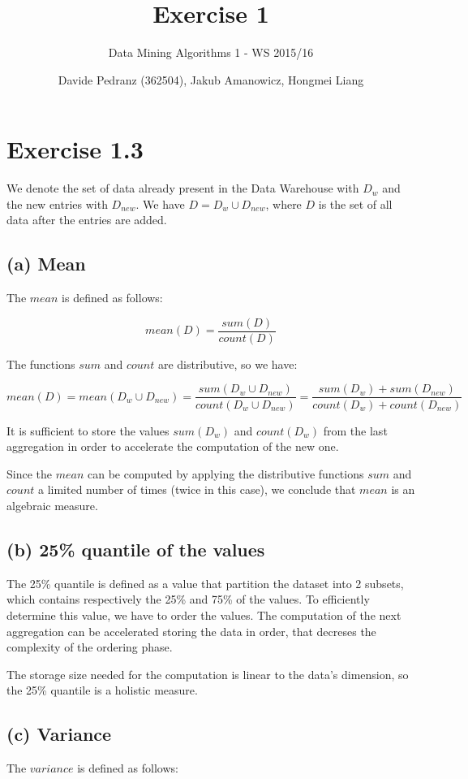 \documentclass{scrartcl}
\title{Exercise 1}
\subtitle{Data Mining Algorithms 1 - WS 2015/16}
\author{Davide Pedranz (362504), Jakub Amanowicz, Hongmei Liang}
\begin{document}
\maketitle

\section*{Exercise 1.3}
We denote the set of data already present in the Data Warehouse with $D_{w}$ and the new entries with $D_{new}$. We have $D = D_{w} \cup D_{new}$, where $D$ is the set of all data after the entries are added.

\subsection*{(a) Mean}
The $mean$ is defined as follows:

$$ mean(D) = \frac{sum(D)}{count(D)} $$

\bigskip
The functions $sum$ and $count$ are distributive, so we have:

$$ mean(D) = mean(D_{w} \cup D_{new}) = \frac{sum(D_{w} \cup D_{new})}{count(D_{w} \cup D_{new})} = \frac{sum(D_{w}) + sum(D_{new})}{count(D_{w}) + count(D_{new})} $$

\bigskip
It is sufficient to store the values $sum(D_{w})$ and $count(D_{w})$ from the last aggregation in order to accelerate the computation of the new one.

Since the $mean$ can be computed by applying the distributive functions $sum$ and $count$ a limited number of times (twice in this case), we conclude that $mean$ is an algebraic measure.

\subsection*{(b) 25\% quantile of the values}
The 25\% quantile is defined as a value that partition the dataset into 2 subsets, which contains respectively the 25\% and 75\% of the values. To efficiently determine this value, we have to order the values. The computation of the next aggregation can be accelerated storing the data in order, that decreses the complexity of the ordering phase.

The storage size needed for the computation is linear to the data's dimension, so the 25\% quantile is a holistic measure.

\subsection*{(c) Variance}
The $variance$ is defined as follows:
\end{document}
